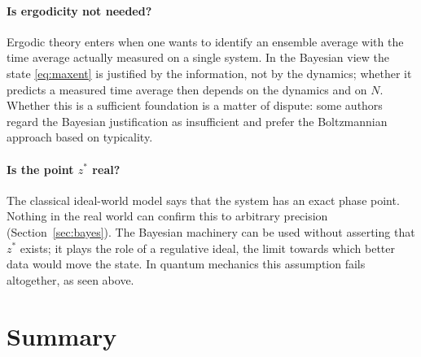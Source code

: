 \paragraph{Is ergodicity not needed?} Ergodic theory enters when one wants to identify an ensemble average with the time average actually measured on a single system. In the Bayesian view the state \eqref{eq:maxent} is justified by the information, not by the dynamics; whether it predicts a measured time average then depends on the dynamics and on $N$. Whether this is a sufficient foundation is a matter of dispute: some authors regard the Bayesian justification as insufficient and prefer the Boltzmannian approach based on typicality.

\paragraph{Is the point $z^*$ real?} The classical ideal-world model says that the system has an exact phase point. Nothing in the real world can confirm this to arbitrary precision (Section~\ref{sec:bayes}). The Bayesian machinery can be used without asserting that $z^*$ exists; it plays the role of a regulative ideal, the limit towards which better data would move the state. In quantum mechanics this assumption fails altogether, as seen above.

\section{Summary}

